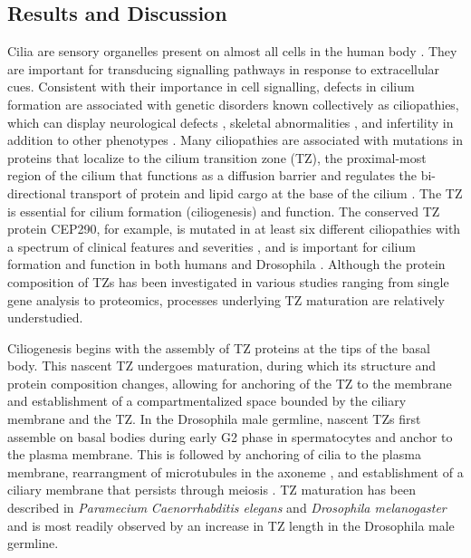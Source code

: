 \documentclass[12pt, twoside, letterpaper]{article}
\begin{document}
\begin{doublespacing}
\begin{linenumbers}
    \section{Results and Discussion}
    Cilia are sensory organelles present on almost all cells in the human body
    \citep{satir2010primary}.
    They are important for transducing signalling pathways in response to extracellular
    cues.
    Consistent with their importance in cell signalling,
    defects in cilium formation are associated with genetic disorders
    known collectively as ciliopathies, which can display
    neurological defects \citep{valente2014primary},
    skeletal abnormalities \citep{hammarsjo2017novel},
    and infertility \citep{inaba2016sperm} in addition to other phenotypes
    \citep{waters2011ciliopathies}.
    Many ciliopathies are associated with mutations in proteins that localize
    to the cilium transition zone (TZ), the proximal-most region of the cilium that
    functions as a diffusion barrier and regulates the
    bi-directional transport of protein and lipid cargo at the base of the cilium
    \citep{reiter2012base, szymanska2012transition}.
    The TZ is essential for cilium formation (ciliogenesis) and function.
    The conserved TZ protein CEP290, for example, is mutated in at least
    six different ciliopathies with a spectrum of clinical features and severities
    , and is important for cilium formation
    and function in both humans \citep{shimada2017vitro, stowe2012centriolar}
    and Drosophila \citep{basiri2014migrating}.
    Although the protein composition of TZs has been investigated in various
    studies ranging from single gene analysis to proteomics,
    processes underlying TZ maturation are relatively understudied.

    Ciliogenesis begins with the assembly of TZ proteins at the tips of
    the basal body.
    This nascent TZ undergoes maturation, during which its structure and protein
    composition changes, allowing for anchoring of the TZ to the membrane and
    establishment of a compartmentalized space bounded by the ciliary membrane
    and the TZ.
    In the Drosophila male germline, nascent TZs first assemble on basal bodies
    during early G2 phase in spermatocytes and anchor to the plasma membrane.
    This is followed by anchoring of cilia to the plasma membrane,
    rearrangment of microtubules in the axoneme \citep{gottardo2013cilium},
    and establishment of a
    ciliary membrane that persists through meiosis \citep{riparbelli2012assembly}.
    TZ maturation has been described in
    \textit{Paramecium} \citep{aubusson2015transition}
    \textit{Caenorrhabditis elegans} \citep{serwas2017centrioles} and
    \textit{Drosophila melanogaster} \citep{gottardo2013cilium}
    and is most readily observed by an increase in TZ length
    in the Drosophila male germline.


\end{linenumbers}
\end{doublespacing}
\end{document}
